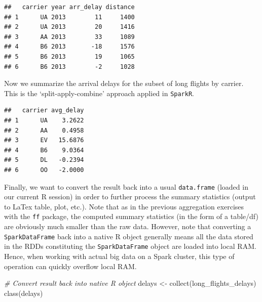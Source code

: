 \documentclass[
  12pt,
]{style/krantz}
\newenvironment{Shaded}{\begin{snugshade}}{\end{snugshade}}
\newcommand{\AttributeTok}[1]{\textcolor[rgb]{0.77,0.63,0.00}{#1}}
\newcommand{\CommentTok}[1]{\textcolor[rgb]{0.56,0.35,0.01}{\textit{#1}}}
\newcommand{\FunctionTok}[1]{\textcolor[rgb]{0.00,0.00,0.00}{#1}}
\newcommand{\NormalTok}[1]{#1}
\newcommand{\OtherTok}[1]{\textcolor[rgb]{0.56,0.35,0.01}{#1}}
\newcommand{\SpecialCharTok}[1]{\textcolor[rgb]{0.00,0.00,0.00}{#1}}
\begin{document}
\begin{verbatim}
##   carrier year arr_delay distance
## 1      UA 2013        11     1400
## 2      UA 2013        20     1416
## 3      AA 2013        33     1089
## 4      B6 2013       -18     1576
## 5      B6 2013        19     1065
## 6      B6 2013        -2     1028
\end{verbatim}

Now we summarize the arrival delays for the subset of long flights by carrier. This is the `split-apply-combine' approach applied in \texttt{SparkR}.

\begin{Shaded}
\end{Shaded}

\begin{verbatim}
##   carrier avg_delay
## 1      UA    3.2622
## 2      AA    0.4958
## 3      EV   15.6876
## 4      B6    9.0364
## 5      DL   -0.2394
## 6      OO   -2.0000
\end{verbatim}

Finally, we want to convert the result back into a usual \texttt{data.frame} (loaded in our current R session) in order to further process the summary statistics (output to LaTex table, plot, etc.). Note that as in the previous aggregation exercises with the \texttt{ff} package, the computed summary statistics (in the form of a table/df) are obviously much smaller than the raw data. However, note that converting a \texttt{SparkDataFrame} back into a native R object generally means all the data stored in the RDDs constituting the \texttt{SparkDataFrame} object are loaded into local RAM. Hence, when working with actual big data on a Spark cluster, this type of operation can quickly overflow local RAM.

\begin{Shaded}
\begin{Highlighting}[]
\CommentTok{\# Convert result back into native R object}
\NormalTok{delays }\OtherTok{\textless{}{-}} \FunctionTok{collect}\NormalTok{(long\_flights\_delays)}
\FunctionTok{class}\NormalTok{(delays)}
\end{Highlighting}
\end{Shaded}
\end{document}
